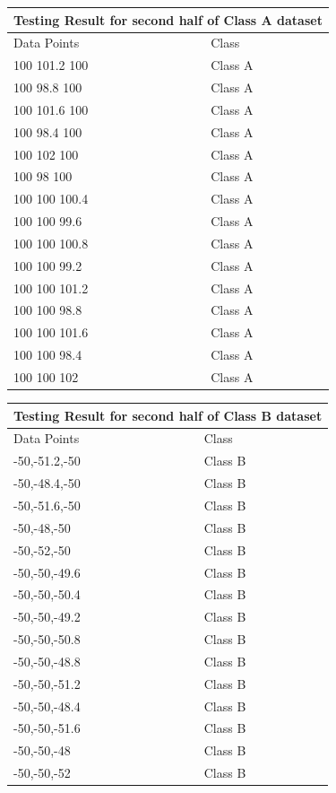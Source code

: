 \documentclass[letterpaper]{article}
\begin{document}
 \begin{tabular}{ |p{5cm}||p{5cm}| }
 \hline
 \multicolumn{2}{|c|}{Testing Result for second half of Class A dataset} \\
 \hline
Data Points& Class\\
 \hline
100 101.2 100 & Class A \\
100 98.8 100 & Class A \\
100 101.6 100 & Class A \\
100 98.4 100 & Class A \\
100 102 100 & Class A \\
100 98 100 & Class A \\
100 100 100.4 & Class A \\
100 100 99.6 & Class A \\
100 100 100.8 & Class A \\
100 100 99.2 & Class A \\
100 100 101.2 & Class A \\
100 100 98.8 & Class A \\
100 100 101.6 & Class A \\
100 100 98.4& Class A \\
100 100 102 & Class A \\
 
 \hline

\end {tabular}

 \begin{tabular}{ |p{5cm}||p{5cm}| }
 \hline
 \multicolumn{2}{|c|}{Testing Result for second half of Class B dataset} \\
 \hline
Data Points& Class\\
 \hline
-50,-51.2,-50 & Class B \\
-50,-48.4,-50 & Class B \\
-50,-51.6,-50 & Class B \\
-50,-48,-50 & Class B \\
-50,-52,-50 & Class B \\
-50,-50,-49.6 & Class B \\
-50,-50,-50.4 & Class B \\
-50,-50,-49.2 & Class B \\
-50,-50,-50.8 & Class B \\
-50,-50,-48.8 & Class B \\
-50,-50,-51.2 & Class B \\
-50,-50,-48.4 & Class B \\
-50,-50,-51.6 & Class B \\
-50,-50,-48 & Class B \\
-50,-50,-52 & Class B \\
 \hline

\end {tabular}
\end{document}
